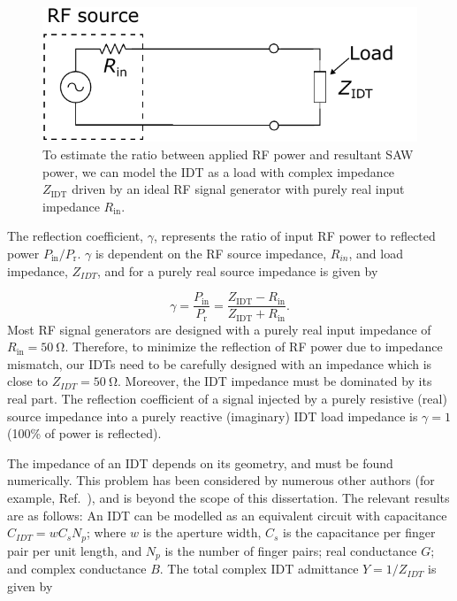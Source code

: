 \documentclass[double,12pt,1in,seploa]{beavtex}
\begin{document}
\begin{figure}
    \includegraphics{IDT signal line model.pdf}
    \caption{To estimate the ratio between applied RF power and resultant SAW power, we can model the IDT as a load with complex impedance $Z_{\mathrm{IDT}}$ driven by an ideal RF signal generator with purely real input impedance $R_{\mathrm{in}}$.}
    \label{transmission line}
\end{figure}
The reflection coefficient, $\gamma$, represents the ratio of input RF power to reflected power $P_{\mathrm{in}}/P_{\mathrm{r}}$. $\gamma$ is dependent on the RF source impedance, $R_{in}$, and load impedance, $Z_{IDT}$, and for a purely real source impedance is given by \cite{kurokawa_power_1965}

\begin{equation}
    \gamma = \frac{P_{\mathrm{in}}}{P_{\mathrm{r}}} = \frac{Z_{\mathrm{IDT}} - R_{\mathrm{in}}}{Z_{\mathrm{IDT}} + R_{\mathrm{in}}}.
    \label{reflection coefficient}
\end{equation}
Most RF signal generators are designed with a purely real input impedance of $R_{\mathrm{in}} = \SI{50}{\ohm}$. Therefore, to minimize the reflection of RF power due to impedance mismatch, our IDTs need to be carefully designed with an impedance which is close to $Z_{IDT} = \SI{50}{\ohm}$. Moreover, the IDT impedance must be dominated by its real part. The reflection coefficient of a signal injected by a purely resistive (real) source impedance into a purely reactive (imaginary) IDT load impedance is $\gamma = 1$ (100\% of power is reflected).

The impedance of an IDT depends on its geometry, and must be found numerically. This problem has been considered by numerous other authors (for example, Ref.\ \cite{smith_analysis_1969}), and is beyond the scope of this dissertation. The relevant results are as follows: An IDT can be modelled as an equivalent circuit with capacitance $C_{IDT} = w C_s N_p$; where $w$ is the aperture width, $C_s$ is the capacitance per finger pair per unit length, and $N_p$ is the number of finger pairs; real conductance $G$; and complex conductance $B$. The total complex IDT admittance $Y = 1/Z_{IDT}$ is given by 
\end{document}
